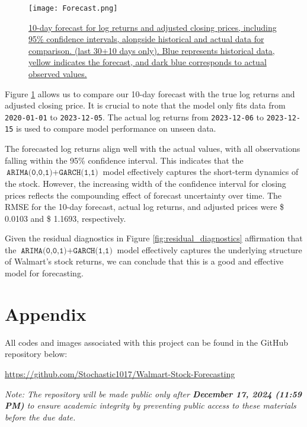 \documentclass{article}
\newcommand{\1}{\mathbbm{1}}
\theoremstyle{definition}
\begin{document}
\begin{figure}[H]
\centering
\texttt{[image: Forecast.png]}
\caption{\small{\href{https://github.com/Stochastic1017/Walmart-Stock-Forecasting/blob/main/R/Plot_Forecast.R}{10-day forecast for log returns and adjusted closing prices, including 95\% confidence intervals, alongside historical and actual data for comparison. (last 30+10 days only). Blue represents historical data, yellow indicates the forecast, and dark blue corresponds to actual observed values.}}}
\label{fig:forecast}
\end{figure}

Figure \ref{fig:forecast} allows us to compare our 10-day forecast with the true log returns and adjusted closing price. It is crucial to note that the model only fits data from \texttt{2020-01-01} to \texttt{2023-12-05}. The actual log returns from \texttt{2023-12-06} to \texttt{2023-12-15} is used to compare model performance on unseen data.

The forecasted log returns align well with the actual values, with all observations falling within the 95\% confidence interval. This indicates that the $\texttt{ARIMA(0,0,1)} + \texttt{GARCH(1,1)}$ model effectively captures the short-term dynamics of the stock. However, the increasing width of the confidence interval for closing prices reflects the compounding effect of forecast uncertainty over time. The RMSE for the 10-day forecast, actual log returns, and adjusted prices were \$ 0.0103 and \$ 1.1693, respectively.

Given the residual diagnostics in Figure \ref{fig:residual_diagnostics} affirmation that the $\texttt{ARIMA(0,0,1)} + \texttt{GARCH(1,1)}$ model effectively captures the underlying structure of Walmart's stock returns, we can conclude that this is a good and effective model for forecasting.



\newpage
\section*{Appendix}

All codes and images associated with this project can be found in the GitHub repository below:

\begin{center}
\url{https://github.com/Stochastic1017/Walmart-Stock-Forecasting}
\end{center}

\textit{Note: The repository will be made public only after \textbf{December 17, 2024 (11:59 PM)} to ensure academic integrity by preventing public access to these materials before the due date.}\\
\end{document}

